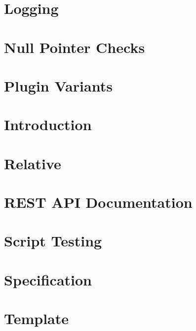 \let\mypdfximage\pdfximage\def\pdfximage{\immediate\mypdfximage}\documentclass[twoside]{book}
\newcommand{\+}{\discretionary{\mbox{\scriptsize$\hookleftarrow$}}{}{}}
\begin{document}
\chapter{Logging}
\label{doc_decisions_logging_md}

\chapter{Null Pointer Checks}
\label{doc_decisions_null_pointer_checks_md}

\chapter{Plugin Variants}
\label{doc_decisions_plugin_variants_md}

\chapter{Introduction}
\label{doc_decisions_README_md}

\chapter{Relative}
\label{doc_decisions_relative_md}

\chapter{R\+E\+ST A\+PI Documentation}
\label{doc_decisions_rest_api_documentation_md}

\chapter{Script Testing}
\label{doc_decisions_script_testing_md}

\chapter{Specification}
\label{doc_decisions_specification_md}

\chapter{Template}
\label{doc_decisions_template_md}

\end{document}
